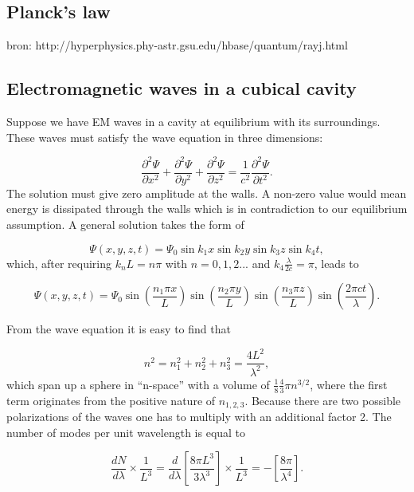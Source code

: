 \begin{appendices}
\chapter{Planck's law}
\label{ch:planck}
bron: http://hyperphysics.phy-astr.gsu.edu/hbase/quantum/rayj.html
\section{Electromagnetic waves in a cubical cavity}
Suppose we have EM waves in a cavity at equilibrium with its surroundings. These waves must satisfy the wave equation in three dimensions:

\begin{equation}
\label{eq:wave}
\frac{\partial^2 \Psi}{\partial x^2} + \frac{\partial^2 \Psi}{\partial y^2} + \frac{\partial^2 \Psi}{\partial z^2} = \frac{1}{c^2} \frac{\partial^2 \Psi}{\partial t^2}.
\end{equation}
The solution must give zero amplitude at the walls. A non-zero value would mean energy is dissipated through the walls which is in contradiction to our equilibrium assumption. A general solution takes the form of

\begin{equation}
\Psi(x,y,z,t) = \Psi_0 \sin{k_1x} \sin{k_2y} \sin{k_3z} \sin{k_4 t},
\end{equation}
which, after requiring $k_n L = n \pi$ with $n=0,1,2...$ and $k_4 \frac{\lambda}{2c} = \pi$, leads to

\begin{equation}
\Psi(x,y,z,t) = \Psi_0 \sin{\left(\frac{n_1 \pi x}{L}\right)} \sin{\left(\frac{n_2 \pi y}{L}\right)} \sin{\left(\frac{n_3 \pi z}{L}\right)} \sin{\left(\frac{2\pi ct}{\lambda}\right)}.
\end{equation}

From the wave equation it is easy to find that

\begin{equation}
\label{eq:n}
n^2 = n_1^2 + n_2^2 + n_3^2 = \frac{4L^2}{\lambda^2},
\end{equation}
which span up a sphere in ``n-space'' with a volume of $\frac{1}{8}\frac{4}{3}\pi n^{3/2}$, where the first term originates from the positive nature of $n_{1,2,3}$. Because there are two possible polarizations of the waves one has to multiply with an additional factor 2. The number of modes per unit wavelength is equal to

\begin{equation}
\frac{dN}{d\lambda} \times \frac{1}{L^3} = \frac{d}{d\lambda}\left[\frac{8\pi L^3}{3\lambda^3}\right]  \times \frac{1}{L^3} = - \left[\frac{8\pi}{\lambda^4}\right].
\end{equation}

\end{appendices}
